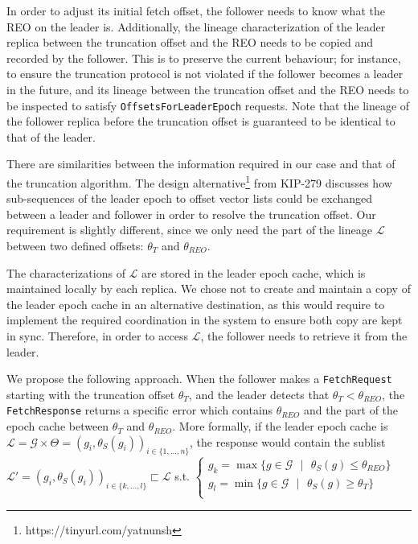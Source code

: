 \documentclass{article}
\newcommand*\circled[1]{\tikz[baseline=(char.base)]{
		\node[shape=circle,draw,inner sep=1pt] (char) {#1};}}
\begin{document}
In order to adjust its initial fetch offset, the follower needs to know what the REO on the leader is. Additionally, the lineage characterization of the leader replica between the truncation offset and the REO needs to be copied and recorded by the follower. This is to preserve the current behaviour; for instance, to ensure the truncation protocol is not violated if the follower becomes a leader in the future, and its lineage between the truncation offset and the REO needs to be inspected to satisfy \texttt{OffsetsForLeaderEpoch} requests. Note that the lineage of the follower replica before the truncation offset is guaranteed to be identical to that of the leader.

There are similarities between the information required in our case and that of the truncation algorithm. The design alternative\footnote{https://tinyurl.com/yatnunsh} \circled{2} from KIP-279 \cite{KIP279} discusses how sub-sequences of the leader epoch to offset vector lists could be exchanged between a leader and follower in order to resolve the truncation offset. Our requirement is slightly different, since we only need the part of the lineage $\mathcal{L}$ between two defined offsets: $\theta_{T}$ and $\theta_{REO}$.

The characterizations of $\mathcal{L}$ are stored in the leader epoch cache, which is maintained locally by each replica. We chose not to create and maintain a copy of the leader epoch cache in an alternative destination, as this would require to implement the required coordination in the system to ensure both copy are kept in sync. Therefore, in order to access $\mathcal{L}$, the follower needs to retrieve it from the leader.

We propose the following approach. When the follower makes a \texttt{FetchRequest} starting with the truncation offset $\theta_T$, and the leader detects that $\theta_T < \theta_{REO}$, the \texttt{FetchResponse} returns a specific error which contains $\theta_{REO}$ and the part of the epoch cache between $\theta_T$ and $\theta_{REO}$. More formally, if the leader epoch cache is  $\mathcal{L}=\mathcal{G}\times\Theta=(g_i, \theta_S(g_i))_{i \in \{1,...,n\}}$, the response would contain the sublist $\mathcal{L'}=(g_i, \theta_S(g_i))_{i \in \{k,...,l\}} \sqsubset \mathcal{L}$ s.t. $\left\{
\begin{array}{l}
g_k=\max \texttt{} \{g \in \mathcal{G} \texttt{ } | \texttt{ } \theta_S(g) \leq \theta_{REO}\}\\
g_l=\min \texttt{} \{g \in \mathcal{G} \texttt{ } | \texttt{ } \theta_S(g) \geq \theta_T\}\\
\end{array}
\right.$
\end{document}
